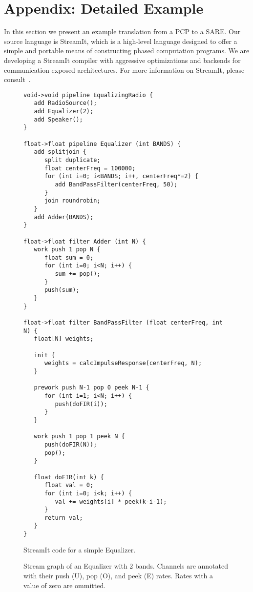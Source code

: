 \section{Appendix: Detailed Example}

In this section we present an example translation from a PCP to a
SARE.  Our source language is StreamIt, which is a high-level language
designed to offer a simple and portable means of constructing phased
computation programs.  We are developing a StreamIt compiler with
aggressive optimizations and backends for communication-exposed
architectures.  For more information on StreamIt, please
consult~\cite{streamitcc,Gordo02}.

\begin{figure}[t]
\scriptsize
\begin{minipage}{3in}
\begin{verbatim}
void->void pipeline EqualizingRadio {
   add RadioSource();
   add Equalizer(2);
   add Speaker();
}

float->float pipeline Equalizer (int BANDS) {
   add splitjoin {
      split duplicate;
      float centerFreq = 100000;
      for (int i=0; i<BANDS; i++, centerFreq*=2) {
         add BandPassFilter(centerFreq, 50);
      }
      join roundrobin;
   }
   add Adder(BANDS);
}

float->float filter Adder (int N) {
   work push 1 pop N {
      float sum = 0;
      for (int i=0; i<N; i++) {
         sum += pop();
      }
      push(sum);
   }
}

float->float filter BandPassFilter (float centerFreq, int N) {
   float[N] weights;

   init {
      weights = calcImpulseResponse(centerFreq, N);
   }

   prework push N-1 pop 0 peek N-1 {
      for (int i=1; i<N; i++) {
         push(doFIR(i));
      }
   }

   work push 1 pop 1 peek N {
      push(doFIR(N));
      pop();
   }

   float doFIR(int k) {
      float val = 0;
      for (int i=0; i<k; i++) {
         val += weights[i] * peek(k-i-1);
      }
      return val;
   }
}
\end{verbatim}
\vspace{-6pt}
\caption{StreamIt code for a simple Equalizer.
\protect\label{fig:eq-code}}
\end{minipage}
\begin{minipage}{3.5in}
\vspace{2.125in}
\vspace{12pt}
\caption{Stream graph of an Equalizer with 2 bands.  Channels are
annotated with their push (U), pop (O), and peek (E) rates.  Rates
with a value of zero are ommitted. \protect\label{fig:eq-graph}}
\end{minipage}
\end{figure}

